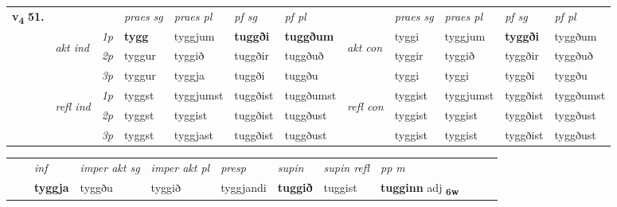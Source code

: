 \begin{tabular}{llllllllllll} \toprule
\multirow{4}{*}{{{\textbf{v{\textsubscript{4}}} \Large{\textbf{51.}}}}}  & &   &  \textit{praes sg}  & \textit{praes pl}  &\textit{ pf sg} & \textit{pf pl} &  &  \textit{praes sg}  & \textit{praes pl}  & \textit{pf sg} & \textit{pf pl } \\*
	\cmidrule{4-7} \cmidrule{9-12}
 & \multirow{3}{*}{\begin{turn}{90}\textit{akt ind}\end{turn}} & {\textit{1p}} & \textbf{tygg} & tyggjum    & \textbf{tuggði} & \textbf{tuggðum} & \multirow{3}{*}{\begin{turn}{90}\textit{akt con}\end{turn}} &tyggi & tyggjum & \textbf{tyggði} & tyggðum\\*
& &  {\textit{2p}} &  tyggur  & tyggið   & tuggðir & tuggðuð & & tyggir & tyggið & tyggðir & tyggðuð \\*
& &  {\textit{3p}} & tyggur & tyggja   & tuggði & tuggðu & & tyggi & tyggi& tyggði & tyggðu  \\*
\cmidrule{4-7} \cmidrule{9-12}
 &\multirow{3}{*}{\begin{turn}{90}\textit{refl ind}\end{turn}} & {\textit{1p}} & tyggst & tyggjumst    & tuggðist & tuggðumst & \multirow{3}{*}{\begin{turn}{90}\textit{refl con}\end{turn}}  &tyggist & tyggjumst & tyggðist & tyggðumst\\*
 &&  {\textit{2p}} &  tyggst  & tyggist   & tuggðist & tuggðust & &tyggist & tyggist & tyggðist & tyggðust \\*
& &  {\textit{3p}} & tyggst & tyggjast   & tuggðist & tuggðust & & tyggist & tyggist& tyggðist & tyggðust  \\*
\cmidrule{4-7} \cmidrule{9-12}
\end{tabular}


\begin{tabular}{llllllllllll}
 & & \textit{inf} & \textit{imper akt sg} & \textit{imper akt pl}   & \textit{presp} & \textit{supin} & \textit{supin refl} & \textit{pp m}     \\*
  & & \textbf{tyggja} & tyggðu  & tyggið   & tyggjandi &  \textbf{tuggið} & tuggist & \textbf{tugginn} adj \textbf{\textsubscript{6w}} \\*
\cmidrule{1-12}
\end{tabular}



